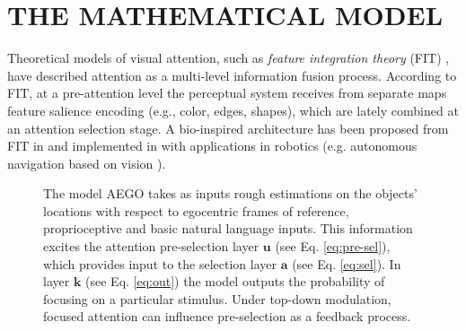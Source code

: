 \documentclass[letterpaper, 10 pt, conference]{ieeeconf}  %
\begin{document}
	
	\section{THE MATHEMATICAL MODEL}	
	\label{sec:model}
	
	Theoretical models of visual attention, such as \textit{feature integration theory} (FIT) \cite{treisman1980}, have described attention as a multi-level information fusion process. According to FIT, at a pre-attention level the perceptual system receives from separate maps feature salience encoding (e.g., color, edges, shapes), which are lately combined at an attention selection stage. A bio-inspired architecture has been proposed from FIT in \cite{koch1985} and implemented in \cite{itti1998} with applications in robotics (e.g. autonomous navigation based on vision \cite{siagian2014}).

	\begin{figure}[h!]
		\caption{The model AEGO takes as inputs rough estimations on the objects' locations with respect to egocentric frames of reference, proprioceptive and basic natural language inputs. This information excites the attention pre-selection layer $\mathbf{u}$ (see Eq. \eqref{eq:pre-sel}), which provides input to the selection layer $\mathbf{a}$ (see Eq. \eqref{eq:sel}). In layer $\mathbf{k}$ (see Eq. \eqref{eq:out}) the model outputs the probability of focusing on a particular stimulus. Under top-down modulation, focused attention can influence pre-selection as a feedback process.}
		\label{fig:AEGO}
	\end{figure}
\end{document}

